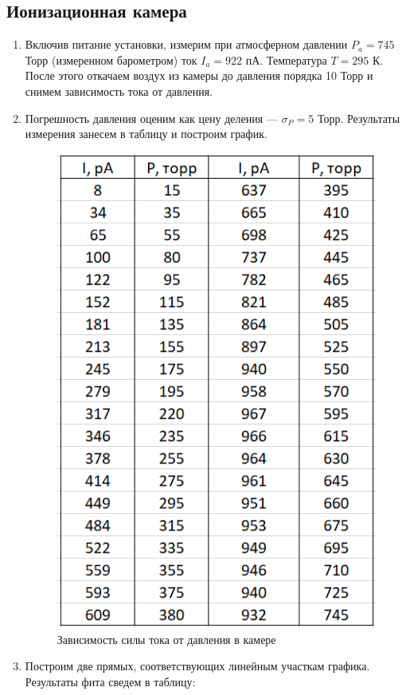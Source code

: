 \documentclass[a4paper, 12pt]{article}%
\begin{document}
	\subsection{Ионизационная камера}

\begin{enumerate}	
	\item Включив питание установки, измерим при атмосферном давлении $P_a  = 745$ Торр (измеренном барометром) ток $I_a = 922$ пА. Температура $T = 295$ К. После этого откачаем воздух из камеры до давления порядка 10 Торр и снимем зависимость тока от давления.
	
	\item Погрешность давления оценим как цену деления --- $ \sigma_P = 5 $ Торр. Результаты измерения занесем в таблицу и построим график.

\begin{center}    
    \begin{figure}[h!]
    \centering
		\includegraphics[width=0.5\linewidth]{images/table_2.png}
		\caption{Зависимость силы тока от давления в камере}
		\label{table 2}
	\end{figure}
\end{center}

	\item Построим две прямых, соответствующих линейным участкам графика. Результаты фита сведем в таблицу: 


\end{enumerate}
\end{document}
